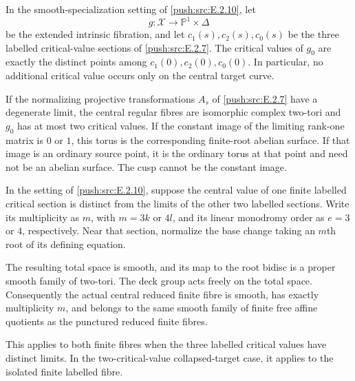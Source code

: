 \begin{proposition}\hypertarget{tag-032X}{}\label{push:src:E.2.12}


In the smooth-specialization setting of \ref{push:src:E.2.10}, let
\[
 g:\mathcal X\longrightarrow\mathbb P^1\times\Delta
\]
be the extended intrinsic fibration, and let
$c_1(s),c_2(s),c_0(s)$ be the three labelled critical-value
sections of \ref{push:src:E.2.7}.  The critical values of $g_0$ are exactly
the distinct points among $c_1(0),c_2(0),c_0(0)$.
In particular, no additional critical value occurs only
on the central target curve.

If the normalizing projective transformations $A_s$ of
\ref{push:src:E.2.7} have a degenerate limit, the central regular fibres
are isomorphic complex two-tori and $g_0$ has at most two
critical values.  If the constant image of the limiting
rank-one matrix is $0$ or $1$, this torus is the
corresponding finite-root abelian surface.  If that image
is an ordinary source point, it is the ordinary torus at
that point and need not be an abelian surface.  The cusp
cannot be the constant image.
\end{proposition}

\begin{proposition}\hypertarget{tag-032Y}{}\label{push:src:E.2.13}


In the setting of \ref{push:src:E.2.10}, suppose the central value of
one finite labelled critical section is distinct from
the limits of the other two labelled sections.  Write
its multiplicity as $m$, with $m=3k$ or $4l$, and its
linear monodromy order as $e=3$ or $4$, respectively.
Near that section, normalize the base change taking
an $m$th root of its defining equation.

The resulting total space is smooth, and its map to
the root bidisc is a proper smooth family of two-tori.
The deck group acts freely on the total space.
Consequently the actual central reduced finite fibre
is smooth, has exactly multiplicity $m$, and belongs
to the same smooth family of finite free affine
quotients as the punctured reduced finite fibres.

This applies to both finite fibres when the three
labelled critical values have distinct limits.  In
the two-critical-value collapsed-target case, it
applies to the isolated finite labelled fibre.
\end{proposition}


